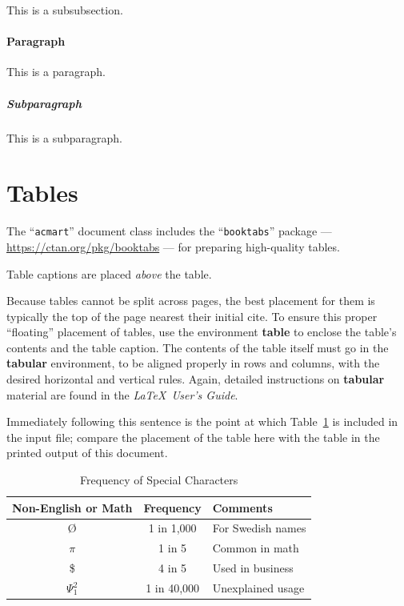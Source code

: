\documentclass[acmlarge]{acmart}
\begin{document}
This is a subsubsection.

\paragraph{Paragraph}

This is a paragraph.

\subparagraph{Subparagraph}

This is a subparagraph.

\section{Tables}

The ``\verb|acmart|'' document class includes the ``\verb|booktabs|''
package --- \url{https://ctan.org/pkg/booktabs} --- for preparing
high-quality tables.

Table captions are placed {\itshape above} the table.

Because tables cannot be split across pages, the best placement for
them is typically the top of the page nearest their initial cite.  To
ensure this proper ``floating'' placement of tables, use the
environment \textbf{table} to enclose the table's contents and the
table caption.  The contents of the table itself must go in the
\textbf{tabular} environment, to be aligned properly in rows and
columns, with the desired horizontal and vertical rules.  Again,
detailed instructions on \textbf{tabular} material are found in the
\textit{\LaTeX\ User's Guide}.

Immediately following this sentence is the point at which
Table~\ref{tab:freq} is included in the input file; compare the
placement of the table here with the table in the printed output of
this document.

\begin{table}
  \caption{Frequency of Special Characters}
  \label{tab:freq}
  \begin{tabular}{ccl}
    \toprule
    Non-English or Math&Frequency&Comments\\
    \midrule
    \O & 1 in 1,000& For Swedish names\\
    $\pi$ & 1 in 5& Common in math\\
    \$ & 4 in 5 & Used in business\\
    $\Psi^2_1$ & 1 in 40,000& Unexplained usage\\
  \bottomrule
\end{tabular}
\end{table}
\end{document}
